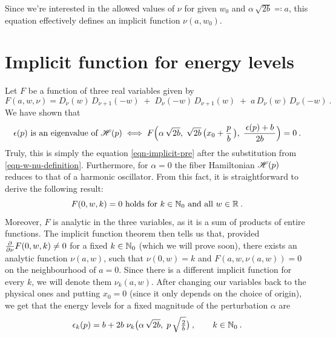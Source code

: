 Since we're interested in the allowed values of $\nu$ for given $w_0$ and $\alpha \, \sqrt{2b} \eqqcolon a$, this equation effectively defines an implicit function $\nu(a, w_0)$.

\section{Implicit function for energy levels}
Let $F$ be a function of three real variables given by
\begin{equation*}
    F(a, w, \nu) =
    D_\nu(w) \, D_{\nu+1}(-w)
    \;+\; D_\nu(-w) \, D_{\nu+1}(w)
    \;+\; a \, D_\nu(w) \, D_\nu(-w)
    \: .
\end{equation*}
We have shown that
\begin{align*}
    \epsilon(p) \text{ is an eigenvalue of } \mathscr{H}(p)
    \; \Longleftrightarrow \;
    F\Big(
        \alpha \, \sqrt{2b}, \;
        \sqrt{2b} \, \big( x_0 + \frac{p}{b} \, \big), \;
        \frac{\, \epsilon(p) + b \,}{2b}
    \Big) = 0 \: .
\end{align*}
Truly, this is simply the equation \eqref{eqn-implicit-pre} after the substitution from \eqref{eqn-w-nu-definition}. Furthermore, for $\alpha = 0$ the fiber Hamiltonian $\mathscr{H}(p)$ reduces to that of a harmonic oscillator. From this fact, it is straightforward to derive the following result:
\begin{equation*}
    F(0, w, k) = 0
    \text{ holds for }
    k \in \mathbb{N}_0
    \text{ and all }
    w \in \mathbb{R}
    \: .
\end{equation*}
Moreover, $F$ is analytic in the three variables, as it is a sum of products of entire functions. The implicit function theorem then tells us that, provided $\frac{\partial }{\partial \nu} F(0, w, k) \neq 0$ for a fixed $k \in \mathbb{N}_0$ (which we will prove soon), there exists an analytic function $\nu(a, w)$, such that $\nu(0,w) = k$ and $F(a, w, \nu(a,w)) = 0$ on the neighbourhood of $a=0$. Since there is a different implicit function for every $k$, we will denote them $\nu_k(a,w)$. After changing our variables back to the physical ones and putting $x_0=0$ (since it only depends on the choice of origin), we get that the energy levels for a fixed magnitude of the perturbation $\alpha$ are
\begin{equation*}
    \epsilon_k(p) = b + 2b\;\nu_k\big( \alpha \, \sqrt{2b}, \; p \, \sqrt{\tfrac{2}{b}}  \big) \: ,
    \qquad k \in \mathbb{N}_0 \: .
\end{equation*}

